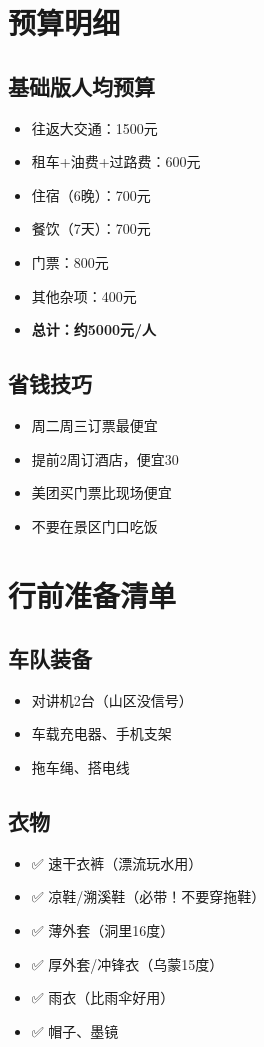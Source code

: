 \documentclass[12pt,a4paper,UTF8]{ctexart}
\begin{document}
\newpage

\section{预算明细}

\subsection{基础版人均预算}
\begin{itemize}
\item 往返大交通：1500元
\item 租车+油费+过路费：600元
\item 住宿（6晚）：700元
\item 餐饮（7天）：700元
\item 门票：800元
\item 其他杂项：400元
\item \textbf{总计：约5000元/人}
\end{itemize}

\subsection{省钱技巧}
\begin{itemize}
\item 周二周三订票最便宜
\item 提前2周订酒店，便宜30%
\item 美团买门票比现场便宜
\item 不要在景区门口吃饭
\end{itemize}

\newpage

\section{行前准备清单}

\subsection{车队装备}
\begin{itemize}
\item 对讲机2台（山区没信号）
\item 车载充电器、手机支架
\item 拖车绳、搭电线
\end{itemize}

\subsection{衣物}
\begin{itemize}
\item ✅ 速干衣裤（漂流玩水用）
\item ✅ 凉鞋/溯溪鞋（必带！不要穿拖鞋）
\item ✅ 薄外套（洞里16度）
\item ✅ 厚外套/冲锋衣（乌蒙15度）
\item ✅ 雨衣（比雨伞好用）
\item ✅ 帽子、墨镜
\end{itemize}
\end{document}
